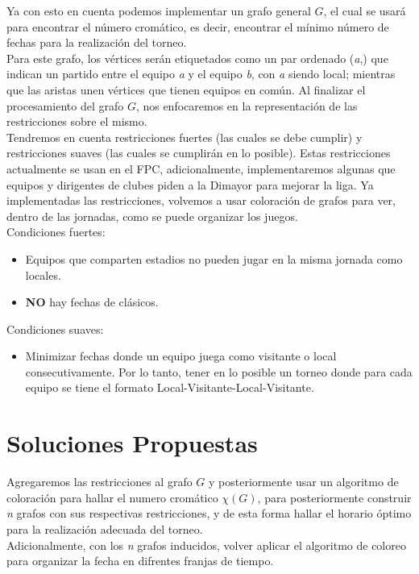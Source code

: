 \documentclass[11pt]{article}
\begin{document}
\begin{multicols}{2}
            Ya con esto en cuenta podemos implementar un grafo general $G$, el cual se usará para 
            encontrar el número cromático, es decir, encontrar el mínimo número de fechas para la 
            realización del torneo.\\
            Para este grafo, los vértices serán etiquetados como un par ordenado (\textit{a},) que indican un 
            partido entre el equipo \textit{a} y el equipo \textit{b}, con \textit{a} siendo local; mientras que las aristas unen 
            vértices que tienen equipos en común. Al finalizar el procesamiento del grafo $G$, nos enfocaremos en la representación de las restricciones
            sobre el mismo.\\[10pt]
            Tendremos en cuenta restricciones fuertes (las cuales se debe cumplir) y restricciones 
            suaves (las cuales se cumplirán en lo posible). Estas restricciones 
            actualmente se usan en el FPC, adicionalmente, implementaremos algunas que equipos y 
            dirigentes de clubes piden a la Dimayor para mejorar la liga. Ya implementadas las 
            restricciones, volvemos a usar coloración de grafos para ver, dentro de las jornadas, como 
            se puede organizar los juegos.\\[10pt]
            Condiciones fuertes:
            \begin{itemize}
                \item Equipos que comparten estadios no pueden jugar en la misma jornada como locales.
                \item \textbf{NO} hay fechas de clásicos.
            \end{itemize}
            Condiciones suaves:
            \begin{itemize}  
                \item Minimizar fechas donde un equipo juega como visitante o local consecutivamente. 
                Por lo tanto, tener en lo posible un torneo donde para cada equipo se tiene 
                el formato Local-Visitante-Local-Visitante.     
            \end{itemize}

        \section{Soluciones Propuestas}
            
            Agregaremos las restricciones al grafo $G$ y posteriormente usar un algoritmo de coloración para hallar el numero cromático $\chi(G)$, para 
            posteriormente construir \textit{n} grafos con sus respectivas restricciones, y de esta forma 
            hallar el horario óptimo para la realización adecuada del torneo.\\
            Adicionalmente, con los \textit{n} grafos inducidos, volver aplicar el algoritmo de coloreo para organizar la fecha en difrentes
            franjas de tiempo.
            
        
        

    \end{multicols}
\end{document}
